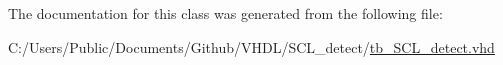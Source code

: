 The documentation for this class was generated from the following file\+:\begin{DoxyCompactItemize}
\item 
C\+:/\+Users/\+Public/\+Documents/\+Github/\+V\+H\+D\+L/\+S\+C\+L\+\_\+detect/\hyperlink{tb___s_c_l__detect_8vhd}{tb\+\_\+\+S\+C\+L\+\_\+detect.\+vhd}\end{DoxyCompactItemize}

